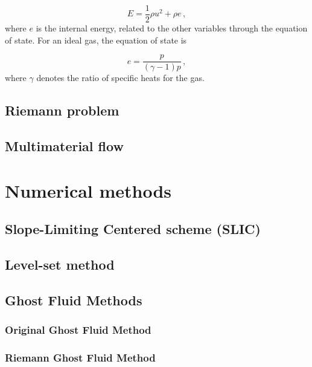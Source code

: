 \documentclass[final,3p,twocolumn]{elsarticle}
\begin{document}
\begin{equation}
    E = \frac{1}{2} \rho u^2 + \rho e \,,
\end{equation}
%
where $e$ is the internal energy, related to the other variables through the equation of state. For an ideal gas, the equation of state is 

\begin{equation}
     e = \frac{p}{(\gamma-1)p} \,,
 \end{equation}
%
where $\gamma$ denotes the ratio of specific heats for the gas. 
\subsection{Riemann problem}
\label{subsec:riemann}

\subsection{Multimaterial flow}
\label{subsec:multimaterial}

\section{Numerical methods}
\label{sec:numerical}

\subsection{Slope-Limiting Centered scheme (SLIC)}
\label{subsec:slic}

\subsection{Level-set method}
\label{subsec:levelset}

\subsection{Ghost Fluid Methods}
\label{subsec:ghostfluid}

\subsubsection{Original Ghost Fluid Method}
\label{subsubsec:ogfm}

\subsubsection{Riemann Ghost Fluid Method}
\label{subsubsec:rgfm}
\end{document}
